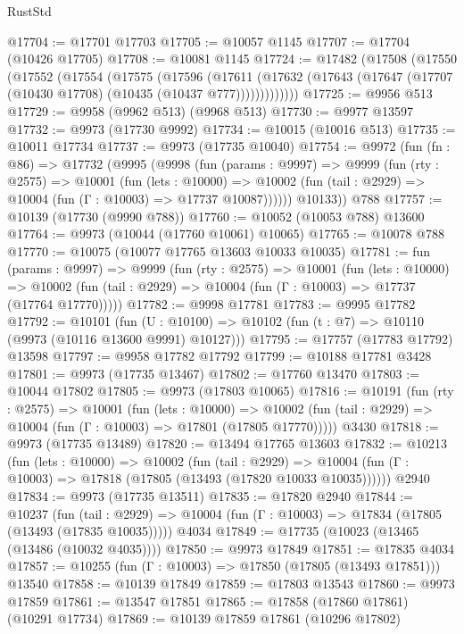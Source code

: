 \begin{lexlean}{RustStd}
\begin{coremodule}
@17704 := @17701 @17703
@17705 := @10057 @1145
@17707 := @17704 (@10426 @17705)
@17708 := @10081 @1145
@17724 := @17482
    (@17508
      (@17550
        (@17552
          (@17554
            (@17575
              (@17596
                (@17611
                  (@17632 (@17643 (@17647 (@17707 (@10430 @17708) (@10435 (@10437 @777)))))))))))))
@17725 := @9956 @513
@17729 := @9958 (@9962 @513) (@9968 @513)
@17730 := @9977 @13597
@17732 := @9973 (@17730 @9992)
@17734 := @10015 (@10016 @513)
@17735 := @10011 @17734
@17737 := @9973 (@17735 @10040)
@17754 := @9972
    (fun (fn : @86) =>
    @17732
      (@9995
        (@9998
          (fun (params : @9997) =>
          @9999
            (fun (rty : @2575) =>
            @10001
              (fun (lets : @10000) =>
              @10002 (fun (tail : @2929) => @10004 (fun (Γ : @10003) => @17737 @10087))))))
        @10133))
    @788
@17757 := @10139 (@17730 (@9990 @788))
@17760 := @10052 (@10053 @788) @13600
@17764 := @9973 (@10044 (@17760 @10061) @10065)
@17765 := @10078 @788
@17770 := @10075 (@10077 @17765 @13603 @10033 @10035)
@17781 := fun (params : @9997) =>
  @9999
    (fun (rty : @2575) =>
    @10001
      (fun (lets : @10000) =>
      @10002 (fun (tail : @2929) => @10004 (fun (Γ : @10003) => @17737 (@17764 @17770)))))
@17782 := @9998 @17781
@17783 := @9995 @17782
@17792 := @10101
    (fun (U : @10100) => @10102 (fun (t : @7) => @10110 (@9973 (@10116 @13600 @9991) @10127)))
@17795 := @17757 (@17783 @17792) @13598
@17797 := @9958 @17782 @17792
@17799 := @10188 @17781 @3428
@17801 := @9973 (@17735 @13467)
@17802 := @17760 @13470
@17803 := @10044 @17802
@17805 := @9973 (@17803 @10065)
@17816 := @10191
    (fun (rty : @2575) =>
    @10001
      (fun (lets : @10000) =>
      @10002 (fun (tail : @2929) => @10004 (fun (Γ : @10003) => @17801 (@17805 @17770)))))
    @3430
@17818 := @9973 (@17735 @13489)
@17820 := @13494 @17765 @13603
@17832 := @10213
    (fun (lets : @10000) =>
    @10002
      (fun (tail : @2929) =>
      @10004 (fun (Γ : @10003) => @17818 (@17805 (@13493 (@17820 @10033 @10035))))))
    @2940
@17834 := @9973 (@17735 @13511)
@17835 := @17820 @2940
@17844 := @10237
    (fun (tail : @2929) => @10004 (fun (Γ : @10003) => @17834 (@17805 (@13493 (@17835 @10035)))))
    @4034
@17849 := @17735 (@10023 (@13465 (@13486 (@10032 @4035))))
@17850 := @9973 @17849
@17851 := @17835 @4034
@17857 := @10255 (fun (Γ : @10003) => @17850 (@17805 (@13493 @17851))) @13540
@17858 := @10139 @17849
@17859 := @17803 @13543
@17860 := @9973 @17859
@17861 := @13547 @17851
@17865 := @17858 (@17860 @17861) (@10291 @17734)
@17869 := @10139 @17859 @17861 (@10296 @17802)

\end{coremodule}
\end{lexlean}
